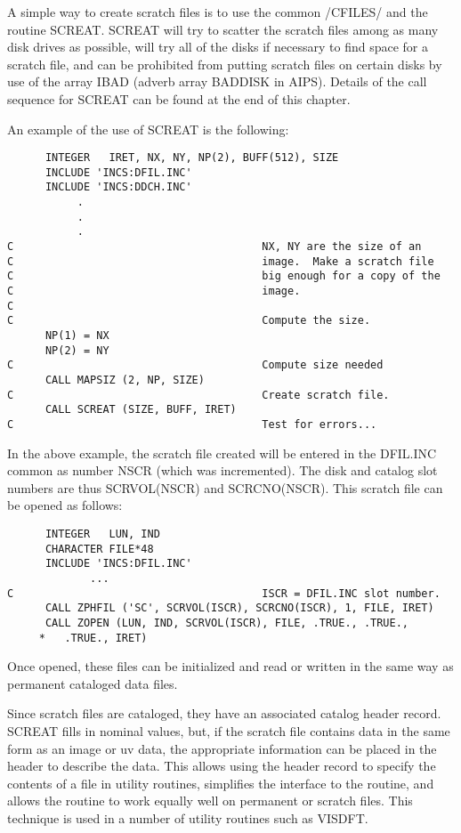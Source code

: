 A simple way to create scratch files is to use the common /CFILES/ and
the routine SCREAT.  SCREAT will try to scatter the scratch files
among as many disk drives as possible, will try all of the disks if
necessary to find space for a scratch file, and can be prohibited from
putting scratch files on certain disks by use of the array IBAD
(adverb array BADDISK in AIPS). Details of the call sequence for
SCREAT can be found at the end of this chapter.

 An example of the use of SCREAT is the following:

\begin{verbatim}
      INTEGER   IRET, NX, NY, NP(2), BUFF(512), SIZE
      INCLUDE 'INCS:DFIL.INC'
      INCLUDE 'INCS:DDCH.INC'
           .
           .
           .
C                                       NX, NY are the size of an
C                                       image.  Make a scratch file
C                                       big enough for a copy of the
C                                       image.
C
C                                       Compute the size.
      NP(1) = NX
      NP(2) = NY
C                                       Compute size needed
      CALL MAPSIZ (2, NP, SIZE)
C                                       Create scratch file.
      CALL SCREAT (SIZE, BUFF, IRET)
C                                       Test for errors...

\end{verbatim}
 In the above example, the scratch file created will be entered in the
DFIL.INC common as number NSCR (which was incremented). The disk and catalog
slot numbers are thus SCRVOL(NSCR) and SCRCNO(NSCR).  This scratch
file can be opened as follows:
\begin{verbatim}
      INTEGER   LUN, IND
      CHARACTER FILE*48
      INCLUDE 'INCS:DFIL.INC'
             ...
C                                       ISCR = DFIL.INC slot number.
      CALL ZPHFIL ('SC', SCRVOL(ISCR), SCRCNO(ISCR), 1, FILE, IRET)
      CALL ZOPEN (LUN, IND, SCRVOL(ISCR), FILE, .TRUE., .TRUE.,
     *   .TRUE., IRET)

\end{verbatim}
Once opened, these files can be initialized and read or written in the
same way as permanent cataloged data files.

Since scratch files are cataloged, they have an associated catalog
header record.  SCREAT fills in nominal values, but, if the scratch
file contains data in the same form as an image or uv data, the
appropriate information can be placed in the header to describe the
data.  This allows using the header record to specify the contents of
a file in utility routines, simplifies the interface to the routine,
and allows the routine to work equally well on permanent or scratch
files. This technique is used in a number of utility routines such as
VISDFT.


